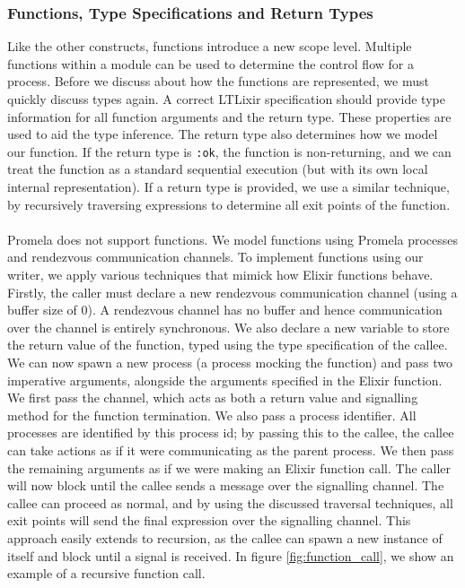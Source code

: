 \subsubsection{Functions, Type Specifications and Return Types}
Like the other constructs, functions introduce a new scope level. Multiple functions within a module can be used to determine the control flow for a process. Before we discuss about how the functions are represented, we must quickly discuss types again. A correct LTLixir specification should provide type information for all function arguments and the return type. These properties are used to aid the type inference. The return type also determines how we model our function. If the return type is \texttt{:ok}, the function is non-returning, and we can treat the function as a standard sequential execution (but with its own local internal representation). If a return type is provided, we use a similar technique, by recursively traversing expressions to determine all exit points of the function. 
\\ \\
Promela does not support functions. We model functions using Promela processes and rendezvous communication channels. To implement functions using our writer, we apply various techniques that mimick how Elixir functions behave. Firstly, the caller must declare a new rendezvous communication channel (using a buffer size of 0). A rendezvous channel has no buffer and hence communication over the channel is entirely synchronous. We also declare a new variable to store the return value of the function, typed using the type specification of the callee. We can now spawn a new process (a process mocking the function) and pass two imperative arguments, alongside the arguments specified in the Elixir function. We first pass the channel, which acts as both a return value and signalling method for the function termination. We also pass a process identifier. All processes are identified by this process id; by passing this to the callee, the callee can take actions as if it were communicating as the parent process. We then pass the remaining arguments as if we were making an Elixir function call. The caller will now block until the callee sends a message over the signalling channel. The callee can proceed as normal, and by using the discussed traversal techniques, all exit points will send the final expression over the signalling channel. This approach easily extends to recursion, as the callee can spawn a new instance of itself and block until a signal is received. In figure \ref{fig:function_call}, we show an example of a recursive function call.
